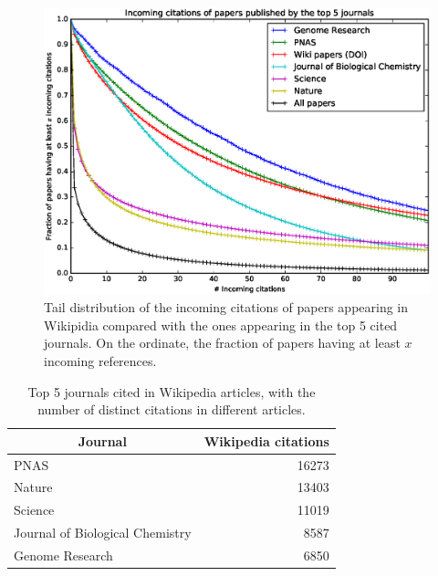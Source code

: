 \begin{figure}[h]
\centering
\includegraphics[keepaspectratio=true, width=\textwidth]{assets/incoming_citations_distribution_ccdf}
\caption{Tail distribution of the incoming citations of papers appearing in Wikipidia compared with the ones appearing in the top 5 cited journals.
On the ordinate, the fraction of papers having at least $x$ incoming references.}
\label{fig:incoming_citations_distribution_ccdf}
\end{figure}

\begin{table}[]
\centering
\begin{tabular}{@{}lr@{}}
\toprule
\multicolumn{1}{c}{\textbf{Journal}} & \textbf{Wikipedia citations} \\ \midrule
PNAS                                 & 16273                        \\
Nature                               & 13403                        \\
Science                              & 11019                        \\
Journal of Biological Chemistry      & 8587                         \\
Genome Research                      & 6850                         \\ \bottomrule
\end{tabular}
\caption{Top 5 journals cited in Wikipedia articles, with the number of distinct citations in different articles.}
\label{tbl:top_cited_wikipedia_journals}
\end{table}

